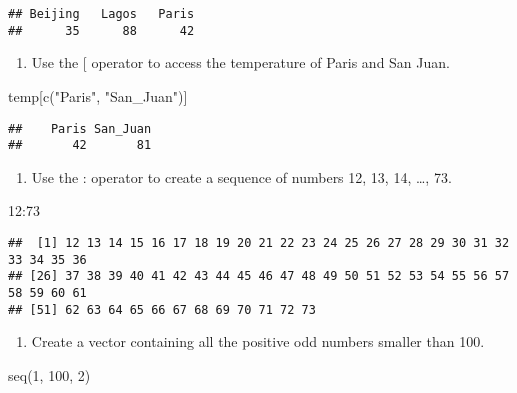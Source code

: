 \documentclass[
]{article}
\newenvironment{Shaded}{\begin{snugshade}}{\end{snugshade}}
\newcommand{\DecValTok}[1]{\textcolor[rgb]{0.00,0.00,0.81}{#1}}
\newcommand{\FunctionTok}[1]{\textcolor[rgb]{0.00,0.00,0.00}{#1}}
\newcommand{\NormalTok}[1]{#1}
\newcommand{\SpecialCharTok}[1]{\textcolor[rgb]{0.00,0.00,0.00}{#1}}
\newcommand{\StringTok}[1]{\textcolor[rgb]{0.31,0.60,0.02}{#1}}
\providecommand{\tightlist}{%
  \setlength{\itemsep}{0pt}\setlength{\parskip}{0pt}}
\begin{document}
\begin{verbatim}
## Beijing   Lagos   Paris 
##      35      88      42
\end{verbatim}

\begin{enumerate}
\def\labelenumi{\arabic{enumi}.}
\setcounter{enumi}{4}
\tightlist
\item
  Use the {[} operator to access the temperature of Paris and San Juan.
\end{enumerate}

\begin{Shaded}
\begin{Highlighting}[]
\NormalTok{temp[}\FunctionTok{c}\NormalTok{(}\StringTok{"Paris"}\NormalTok{, }\StringTok{"San\_Juan"}\NormalTok{)]}
\end{Highlighting}
\end{Shaded}

\begin{verbatim}
##    Paris San_Juan 
##       42       81
\end{verbatim}

\begin{enumerate}
\def\labelenumi{\arabic{enumi}.}
\setcounter{enumi}{5}
\tightlist
\item
  Use the : operator to create a sequence of numbers 12, 13, 14, \ldots,
  73.
\end{enumerate}

\begin{Shaded}
\begin{Highlighting}[]
\DecValTok{12}\SpecialCharTok{:}\DecValTok{73}
\end{Highlighting}
\end{Shaded}

\begin{verbatim}
##  [1] 12 13 14 15 16 17 18 19 20 21 22 23 24 25 26 27 28 29 30 31 32 33 34 35 36
## [26] 37 38 39 40 41 42 43 44 45 46 47 48 49 50 51 52 53 54 55 56 57 58 59 60 61
## [51] 62 63 64 65 66 67 68 69 70 71 72 73
\end{verbatim}

\begin{enumerate}
\def\labelenumi{\arabic{enumi}.}
\setcounter{enumi}{6}
\tightlist
\item
  Create a vector containing all the positive odd numbers smaller than
  100.
\end{enumerate}

\begin{Shaded}
\begin{Highlighting}[]
\FunctionTok{seq}\NormalTok{(}\DecValTok{1}\NormalTok{, }\DecValTok{100}\NormalTok{, }\DecValTok{2}\NormalTok{)}
\end{Highlighting}
\end{Shaded}
\end{document}
